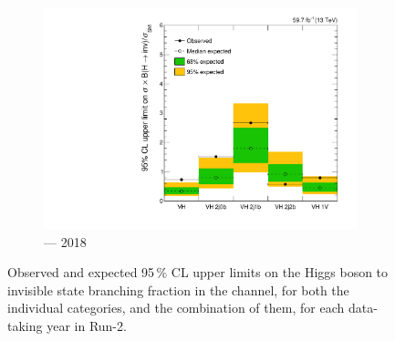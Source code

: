 \begin{figure}[htbp]
    \begin{subfigure}[b]{0.45\textwidth}
        \includegraphics[width=\textwidth]{chapters/higgstoinv/figures/limits/VH/limit_2018_VH.pdf}
        \caption{\VH --- 2018}
    \end{subfigure}
    \caption[Observed and expected 95\,\% CL upper limits on the Higgs boson to invisible state branching fraction in the \VH channel, for both the individual categories, and the combination of them, for each data-taking year in Run-2]{Observed and expected 95\,\% CL upper limits on the Higgs boson to invisible state branching fraction in the \VH channel, for both the individual categories, and the combination of them, for each data-taking year in Run-2.}
    \label{fig:htoinv_limit_VH_per_year}
\end{figure}

